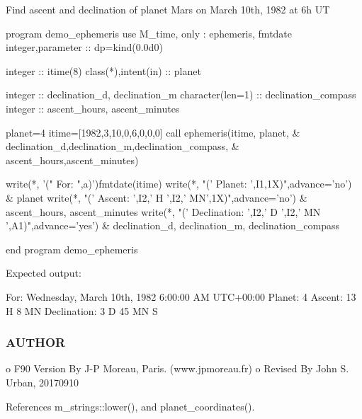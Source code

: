 \begin{DoxyVerb}Find ascent and declination of planet Mars on March 10th, 1982 at 6h UT

  program demo_ephemeris
  use M_time, only : ephemeris, fmtdate
  integer,parameter   :: dp=kind(0.0d0)

  integer             :: itime(8)
  class(*),intent(in) :: planet

  integer            :: declination_d, declination_m
  character(len=1)   :: declination_compass
  integer            :: ascent_hours, ascent_minutes

  planet=4
  itime=[1982,3,10,0,6,0,0,0]
  call ephemeris(itime, planet,                    &
  declination_d,declination_m,declination_compass, &
  ascent_hours,ascent_minutes)

  write(*, '(" For: ",a)')fmtdate(itime)
  write(*, "(' Planet: ',I1,1X)",advance='no')                       &
          planet
  write(*, "(' Ascent: ',I2,' H ',I2,' MN',1X)",advance='no')        &
          ascent_hours, ascent_minutes
  write(*, "(' Declination: ',I2,' D ',I2,' MN ',A1)",advance='yes') &
          declination_d, declination_m, declination_compass

  end program demo_ephemeris

Expected output:

  For: Wednesday, March 10th, 1982 6:00:00 AM UTC+00:00
  Planet: 4  Ascent: 13 H  8 MN  Declination:  3 D 45 MN S
\end{DoxyVerb}


\subsubsection*{A\+U\+T\+H\+OR}

\begin{DoxyVerb}o F90 Version By J-P Moreau, Paris. (www.jpmoreau.fr)
o Revised By John S. Urban, 20170910 \end{DoxyVerb}
 

References m\+\_\+strings\+::lower(), and planet\+\_\+coordinates().

